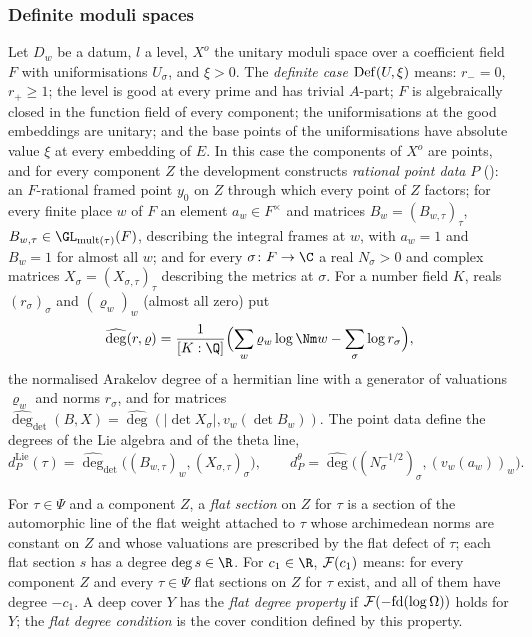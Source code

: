 \subsubsection*{Definite moduli spaces}
Let $D_w$ be a datum, $l$ a level, $X^o$ the unitary moduli space over a coefficient field $F$ with
uniformisations $U_\sigma$, and $\xi>0$. The \emph{definite case} $\mathrm{Def}(U,\xi)$ means:
$r_-=0$, $r_+\ge1$; the level is good at every prime and has trivial $A$-part; $F$ is algebraically
closed in the function field of every component; the uniformisations at the good embeddings are unitary;
and the base points of the uniformisations have absolute value $\xi$ at every embedding of $E$. In this
case the components of $X^o$ are points, and for every component $Z$ the development constructs
\emph{rational point data} $P$
(): an $F$-rational framed point
$y_0$ on $Z$ through which every point of $Z$ factors; for every finite place $w$ of $F$ an element
$a_w\in F^\times$ and matrices $B_{w}=(B_{w,\tau})_\tau$, $B_{w,\tau}\in\GL_{\mathrm{mult}(\tau)}(F)$,
describing the integral frames at $w$, with $a_w=1$ and $B_w=1$ for almost all $w$; and for every
$\sigma\colon F\to\C$ a real $N_\sigma>0$ and complex matrices $X_\sigma=(X_{\sigma,\tau})_\tau$
describing the metrics at $\sigma$. For a number field $K$, reals $(r_\sigma)_\sigma$ and
$(\varrho_w)_w$ (almost all zero) put
\[
\widehat{\deg}(r,\varrho)=\frac1{[K:\Q]}\Bigl(\sum_w\varrho_w\log\Nm w-\sum_\sigma\log r_\sigma\Bigr),
\]
the normalised Arakelov degree of a hermitian line with a generator of valuations $\varrho_w$ and norms
$r_\sigma$, and for matrices $\widehat{\deg}_{\det}(B,X)=\widehat{\deg}(|\det X_\sigma|,v_w(\det B_w))$. The
point data define the degrees of the Lie algebra and of the theta line,
\[
d^{\mathrm{Lie}}_P(\tau)=\widehat{\deg}_{\det}\bigl((B_{w,\tau})_w,(X_{\sigma,\tau})_\sigma\bigr),\qquad
d^{\theta}_P=\widehat{\deg}\bigl((N_\sigma^{-1/2})_\sigma,(v_w(a_w))_w\bigr).
\]

\begin{definition}\label{pf:lift1:flat}
For $\tau\in\Psi$ and a component $Z$, a \emph{flat section} on $Z$ for $\tau$ is a section of the
automorphic line of the flat weight attached to $\tau$ whose archimedean norms are constant on $Z$ and
whose valuations are prescribed by the flat defect of $\tau$; each flat section $s$ has a degree
$\deg s\in\R$. For $c_1\in\R$, $\mathcal F(c_1)$ means: for every component $Z$ and every
$\tau\in\Psi$ flat sections on $Z$ for $\tau$ exist, and all of them have degree $-c_1$. A deep cover $Y$
has the \emph{flat degree property} if $\mathcal F(-\mathrm{fd}(\log\Omega))$ holds for $Y$; the
\emph{flat degree condition} is the cover condition defined by this property.
\end{definition}

